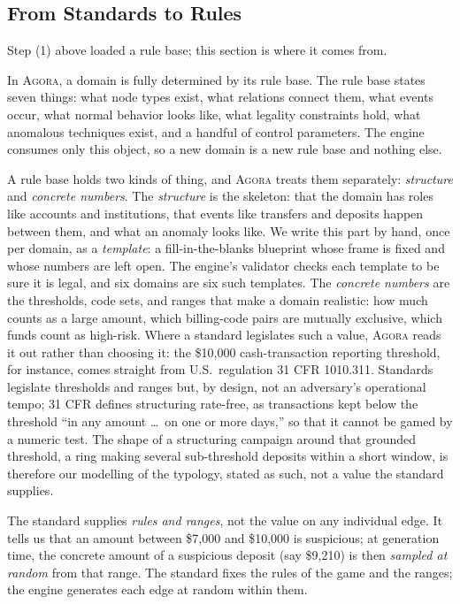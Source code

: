\documentclass[sigconf,review,anonymous]{acmart}
\newcommand{\sys}{\textsc{Agora}\xspace}
\begin{document}
\subsection{From Standards to Rules}
\label{sec:rag}
Step (1) above loaded a rule base; this section is where it comes from.

In \sys{}, a domain is fully determined by its rule base. The rule base states seven
things: what node types exist, what relations connect them, what events occur, what
normal behavior looks like, what legality constraints hold, what anomalous techniques
exist, and a handful of control parameters. The engine consumes only this object, so a
new domain is a new rule base and nothing else.

A rule base holds two kinds of thing, and \sys{} treats them separately:
\emph{structure} and \emph{concrete numbers}. The \emph{structure} is the skeleton:
that the domain has roles like accounts and institutions, that events like transfers
and deposits happen between them, and what an anomaly looks like. We write this part by
hand, once per domain, as a \emph{template}: a fill-in-the-blanks blueprint whose frame
is fixed and whose numbers are left open. The engine's validator checks each template
to be sure it is legal, and six domains are six such templates. The \emph{concrete
numbers} are the thresholds, code sets, and ranges that make a domain realistic: how
much counts as a large amount, which billing-code pairs are mutually exclusive, which
funds count as high-risk. Where a standard legislates such a value, \sys{} reads it out
rather than choosing it: the \$10{,}000 cash-transaction reporting threshold, for
instance, comes straight from U.S.\ regulation 31 CFR 1010.311. Standards legislate
thresholds and ranges but, by design, not an adversary's operational tempo; 31 CFR
defines structuring rate-free, as transactions kept below the threshold ``in any amount
\dots\ on one or more days,'' so that it cannot be gamed by a numeric test. The shape of
a structuring campaign around that grounded threshold, a ring making several
sub-threshold deposits within a short window, is therefore our modelling of the
typology, stated as such, not a value the standard supplies.

The standard supplies
\emph{rules and ranges}, not the value on any individual edge. It tells us that an
amount between \$7{,}000 and \$10{,}000 is suspicious; at generation time, the concrete
amount of a suspicious deposit (say \$9{,}210) is then \emph{sampled at random} from
that range. The standard fixes the rules of the game and the ranges; the engine
generates each edge at random within them.
\end{document}
